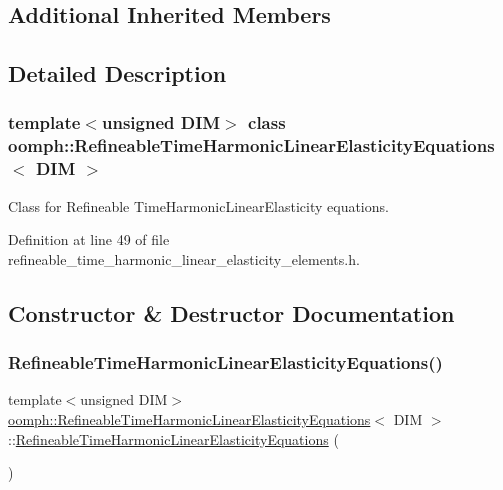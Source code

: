\subsection*{Additional Inherited Members}


\subsection{Detailed Description}
\subsubsection*{template$<$unsigned D\+IM$>$\newline
class oomph\+::\+Refineable\+Time\+Harmonic\+Linear\+Elasticity\+Equations$<$ D\+I\+M $>$}

Class for Refineable Time\+Harmonic\+Linear\+Elasticity equations. 

Definition at line 49 of file refineable\+\_\+time\+\_\+harmonic\+\_\+linear\+\_\+elasticity\+\_\+elements.\+h.



\subsection{Constructor \& Destructor Documentation}
\mbox{\label{classoomph_1_1RefineableTimeHarmonicLinearElasticityEquations_a7ff81e939447f97feb032134a7e49605}} 
\subsubsection{\texorpdfstring{Refineable\+Time\+Harmonic\+Linear\+Elasticity\+Equations()}{RefineableTimeHarmonicLinearElasticityEquations()}}
{\footnotesize\ttfamily template$<$unsigned D\+IM$>$ \\
\hyperlink{classoomph_1_1RefineableTimeHarmonicLinearElasticityEquations}{oomph\+::\+Refineable\+Time\+Harmonic\+Linear\+Elasticity\+Equations}$<$ D\+IM $>$\+::\hyperlink{classoomph_1_1RefineableTimeHarmonicLinearElasticityEquations}{Refineable\+Time\+Harmonic\+Linear\+Elasticity\+Equations} (\begin{DoxyParamCaption}{ }\end{DoxyParamCaption})\hspace{0.3cm}{\ttfamily [inline]}}



